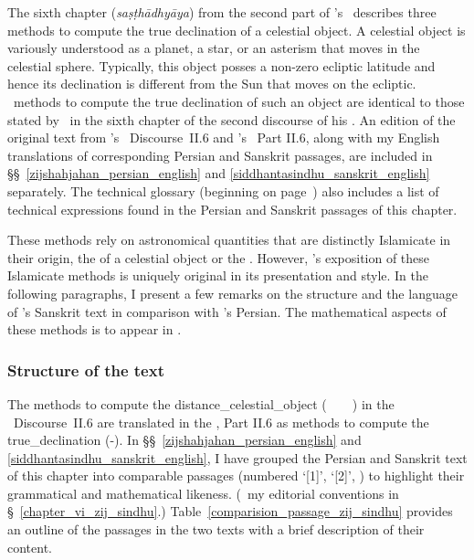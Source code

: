 The sixth chapter (\textit{saṣṭhādhyāya}) from the second part of \Nityananda's \Siddhantasindhu\
describes three methods to compute the true declination of a celestial object. A celestial object is variously understood as a planet, a star, or an asterism that moves in the celestial sphere. Typically, this object posses a non-zero ecliptic latitude and hence its declination is different from the Sun that moves on the ecliptic. \Nityananda\ methods to compute the true declination of such an object are identical to those stated by \MullaFarid\ in the sixth chapter of the second discourse of his \ZijiShahJahani. An edition of the original text from \MullaFarid's \ZijiShahJahani\ Discourse~II.6 and \Nityananda's \Siddhantasindhu\ Part II.6, along with my English translations of corresponding Persian and Sanskrit passages, are included in \S\S~\ref{zijshahjahan_persian_english} and \ref{siddhantasindhu_sanskrit_english} separately. The technical glossary (beginning on page~\pageref{main}) also includes a list of technical expressions found in the Persian and Sanskrit passages of this chapter.

These methods rely on astronomical quantities that are distinctly Islamicate in their origin, \eg the  of a celestial object or the . However, \Nityananda's exposition of these Islamicate methods is uniquely original in its presentation and style. In the following paragraphs, I present a few remarks on the structure and the language of \Nityananda's Sanskrit text in comparison with \MullaFarid's Persian. The mathematical aspects of these methods is to appear in \textcite[forthcoming]{MisraTD}.



\subsubsection{Structure of the text} \label{structure_content_zij_sindhu_chapter_six}
The methods to compute the \gls{distance_celestial_object} (\bud\idafaconsonant\ \kawkab\ \az\ \muaddil\ \alnahar) in the \ZijiShahJahani\ Discourse~II.6 are translated in the \Siddhantasindhu, Part II.6 as methods to compute the \gls{true_declination} (\spasta-\kranti). In \S\S~\ref{zijshahjahan_persian_english} and \ref{siddhantasindhu_sanskrit_english}, I have grouped the Persian and Sanskrit text of this chapter into comparable passages (numbered `[1]', `[2]', \etcp) to highlight their grammatical and mathematical likeness. (\Vid\ my editorial conventions in \S~\ref{chapter_vi_zij_sindhu}.) Table~\ref{comparision_passage_zij_sindhu} provides an outline of the passages in the two texts with a brief description of their content. 

